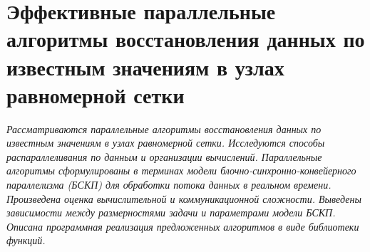 
\section*{Эффективные параллельные 
  алгоритмы восстановления данных по известным значениям 
  в узлах равномерной сетки}

\label{sec:func_recv_annotate}

\bigskip

\textit{
  Рассматриваются параллельные алгоритмы 
  восстановления данных по известным значениям в узлах равномерной сетки.
  Исследуются способы распараллеливания по данным и организации вычислений.
  Параллельные алгоритмы сформулированы в терминах
  модели блочно-синхронно-конвейерного параллелизма (БСКП)
  для обработки потока данных в реальном времени. %
  Произведена оценка вычислительной и коммуникационной сложности.
  Выведены зависимости между размерностями задачи
  и параметрами модели БСКП. %
  Описана программная реализация предложенных алгоритмов
  в виде библиотеки функций. %
}






